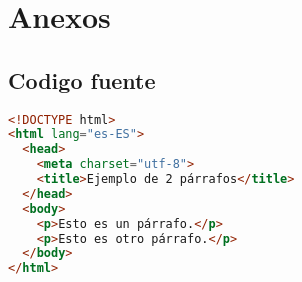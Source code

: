 \chapter{Anexos}

\section{Codigo fuente}

\begin{lstlisting}[language=html]
<!DOCTYPE html>
<html lang="es-ES">
  <head>
    <meta charset="utf-8">
    <title>Ejemplo de 2 párrafos</title>
  </head>
  <body>
    <p>Esto es un párrafo.</p>
    <p>Esto es otro párrafo.</p>
  </body>
</html>
\end{lstlisting}